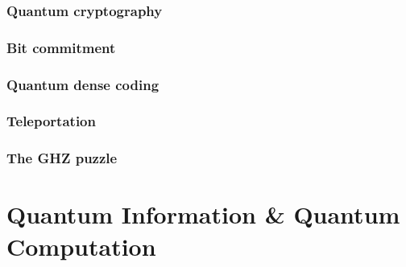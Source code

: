 \documentclass{book}
\theoremstyle{definition}
\begin{document}
\subsection{Quantum cryptography}
\subsection{Bit commitment}
\subsection{Quantum dense coding}
\subsection{Teleportation}
\subsection{The GHZ puzzle}











\chapter{Quantum Information \& Quantum Computation}
\newpage
\end{document}
